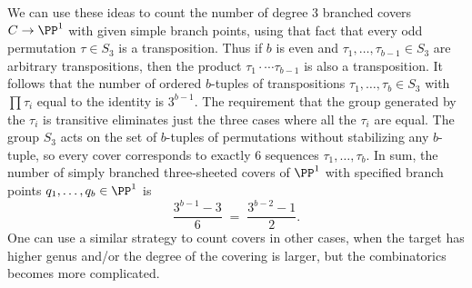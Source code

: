 \begin{example}
We can use these ideas to count the number of degree 3 branched covers $C \to \PP^1$ with given simple branch points, using that fact that every odd permutation $\tau \in S_3$ is a transposition. Thus if $b$ is even and  $\tau_1,\dots,\tau_{b-1} \in S_3$ are arbitrary transpositions, then the product 
$\tau_1\cdot \cdots\tau_{b-1}$ is also a
 transposition. It follows that the number of ordered $b$-tuples of transpositions $\tau_1,\dots,\tau_{b} \in S_3$ with $\prod \tau_i$ equal to the identity is $3^{b-1}$. The requirement that the group generated by the $\tau_i$ is transitive eliminates just the three cases where all the $\tau_i$ are equal. The group $S_3$ acts on the set of $b$-tuples of permutations without stabilizing any $b$-tuple, so every cover corresponds to exactly 6 sequences
  $\tau_1,\dots,\tau_b$. In sum, the number of simply branched three-sheeted covers of $\PP^1$ with specified branch points $q_1,\dots,q_b \in \PP^1$ is
$$
\frac{3^{b-1} - 3}{6} \; = \; \frac{3^{b-2} - 1}{2}.
$$
One can use a similar strategy to count covers in other cases, when the target has higher genus and/or the degree of the covering is larger, but the combinatorics becomes more complicated.
\end{example}

